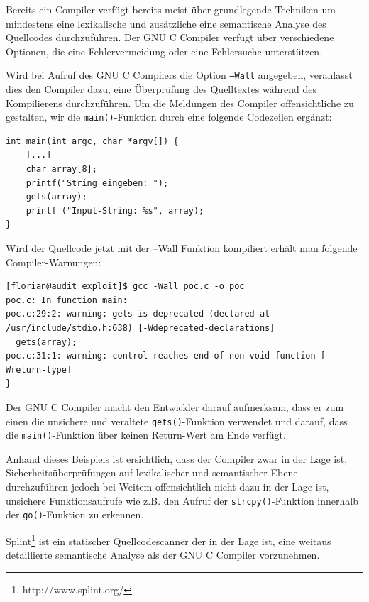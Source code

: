 Bereits ein Compiler verfügt bereits meist über grundlegende Techniken um mindestens eine lexikalische und zusätzliche eine semantische Analyse des Quellcodes durchzuführen. Der GNU C Compiler verfügt über verschiedene Optionen, die eine Fehlervermeidung oder eine Fehlersuche unterstützen.

Wird bei Aufruf des GNU C Compilers die Option \texttt{–Wall} angegeben, veranlasst dies den Compiler dazu, eine Überprüfung des Quelltextes während des Kompilierens durchzuführen. Um die Meldungen des Compiler offensichtliche zu gestalten, wir die \texttt{main()}-Funktion durch eine folgende Codezeilen ergänzt:

\begin{lstlisting}[basicstyle=\ttfamily\footnotesize]
int main(int argc, char *argv[]) {
    [...]
    char array[8];
    printf("String eingeben: ");
    gets(array);
    printf ("Input-String: %s", array);
}
\end{lstlisting}

Wird der Quellcode jetzt mit der –Wall Funktion kompiliert erhält man folgende Compiler-Warnungen:

\begin{lstlisting}[basicstyle=\ttfamily\footnotesize]
[florian@audit exploit]$ gcc -Wall poc.c -o poc
poc.c: In function main:
poc.c:29:2: warning: gets is deprecated (declared at /usr/include/stdio.h:638) [-Wdeprecated-declarations]
  gets(array);
poc.c:31:1: warning: control reaches end of non-void function [-Wreturn-type]
}
\end{lstlisting}

Der GNU C Compiler macht den Entwickler darauf aufmerksam, dass er zum einen die unsichere und veraltete \texttt{gets()}-Funktion verwendet und darauf, dass die \texttt{main()}-Funktion über keinen Return-Wert am Ende verfügt.

Anhand dieses Beispiels ist ersichtlich, dass der Compiler zwar in der Lage ist, Sicherheitsüberprüfungen auf lexikalischer und semantischer Ebene durchzuführen jedoch bei Weitem offensichtlich nicht dazu in der Lage ist, unsichere Funktionsaufrufe wie z.B. den Aufruf der \texttt{strcpy()}-Funktion innerhalb der \texttt{go()}-Funktion zu erkennen.


Splint\footnote{http://www.splint.org/} ist ein statischer Quellcodescanner der in der Lage ist, eine weitaus detaillierte semantische Analyse als der GNU C Compiler vorzunehmen.

